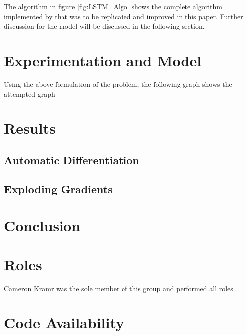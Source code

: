 \documentclass[journal]{IEEEtran}
\begin{document}
The algorithm in figure \ref{fig:LSTM_Algo} shows the complete algorithm implemented by \cite{LSTM} that was to be replicated and improved in this paper. Further discussion for the model will be discussed in the following section.

\section{Experimentation and Model}
Using the above formulation of the problem, the following graph shows the attempted graph 
\section{Results}
\subsection{Automatic Differentiation}
\subsection{Exploding Gradients}
\section{Conclusion}
\section{Roles}
Cameron Kramr was the sole member of this group and performed all roles.
\section{Code Availability}

\nocite{*}


\end{document}
